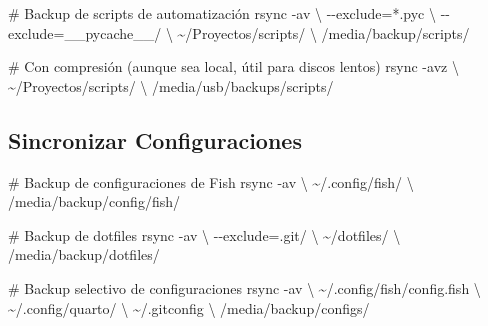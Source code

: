 \documentclass[
  doc,
  floatsintext,
  longtable,
  a4paper,
  nolmodern,
  notxfonts,
  notimes,
  12pt,
  colorlinks=true,linkcolor=blue,citecolor=blue,urlcolor=blue]{apa7}
\newenvironment{Shaded}{\begin{snugshade}}{\end{snugshade}}
\newcommand{\AttributeTok}[1]{\textcolor[rgb]{0.40,0.45,0.13}{#1}}
\newcommand{\CommentTok}[1]{\textcolor[rgb]{0.37,0.37,0.37}{#1}}
\newcommand{\DataTypeTok}[1]{\textcolor[rgb]{0.68,0.00,0.00}{#1}}
\newcommand{\FunctionTok}[1]{\textcolor[rgb]{0.28,0.35,0.67}{#1}}
\newcommand{\NormalTok}[1]{\textcolor[rgb]{0.00,0.23,0.31}{#1}}
\newcommand{\OperatorTok}[1]{\textcolor[rgb]{0.37,0.37,0.37}{#1}}
\newcommand{\StringTok}[1]{\textcolor[rgb]{0.13,0.47,0.30}{#1}}
\begin{document}
\begin{Shaded}
\begin{Highlighting}[]
\CommentTok{\# Backup de scripts de automatización}
\FunctionTok{rsync} \AttributeTok{{-}av} \DataTypeTok{\textbackslash{}}
  \AttributeTok{{-}{-}exclude}\OperatorTok{=}\StringTok{\textquotesingle{}*.pyc\textquotesingle{}} \DataTypeTok{\textbackslash{}}
  \AttributeTok{{-}{-}exclude}\OperatorTok{=}\StringTok{\textquotesingle{}\_\_pycache\_\_/\textquotesingle{}} \DataTypeTok{\textbackslash{}}
\NormalTok{  \textasciitilde{}/Proyectos/scripts/ }\DataTypeTok{\textbackslash{}}
\NormalTok{  /media/backup/scripts/}

\CommentTok{\# Con compresión (aunque sea local, útil para discos lentos)}
\FunctionTok{rsync} \AttributeTok{{-}avz} \DataTypeTok{\textbackslash{}}
\NormalTok{  \textasciitilde{}/Proyectos/scripts/ }\DataTypeTok{\textbackslash{}}
\NormalTok{  /media/usb/backups/scripts/}
\end{Highlighting}
\end{Shaded}

\subsection{Sincronizar
Configuraciones}\label{sincronizar-configuraciones}

\begin{Shaded}
\begin{Highlighting}[]
\CommentTok{\# Backup de configuraciones de Fish}
\FunctionTok{rsync} \AttributeTok{{-}av} \DataTypeTok{\textbackslash{}}
\NormalTok{  \textasciitilde{}/.config/fish/ }\DataTypeTok{\textbackslash{}}
\NormalTok{  /media/backup/config/fish/}

\CommentTok{\# Backup de dotfiles}
\FunctionTok{rsync} \AttributeTok{{-}av} \DataTypeTok{\textbackslash{}}
  \AttributeTok{{-}{-}exclude}\OperatorTok{=}\StringTok{\textquotesingle{}.git/\textquotesingle{}} \DataTypeTok{\textbackslash{}}
\NormalTok{  \textasciitilde{}/dotfiles/ }\DataTypeTok{\textbackslash{}}
\NormalTok{  /media/backup/dotfiles/}

\CommentTok{\# Backup selectivo de configuraciones}
\FunctionTok{rsync} \AttributeTok{{-}av} \DataTypeTok{\textbackslash{}}
\NormalTok{  \textasciitilde{}/.config/fish/config.fish }\DataTypeTok{\textbackslash{}}
\NormalTok{  \textasciitilde{}/.config/quarto/ }\DataTypeTok{\textbackslash{}}
\NormalTok{  \textasciitilde{}/.gitconfig }\DataTypeTok{\textbackslash{}}
\NormalTok{  /media/backup/configs/}
\end{Highlighting}
\end{Shaded}
\end{document}
